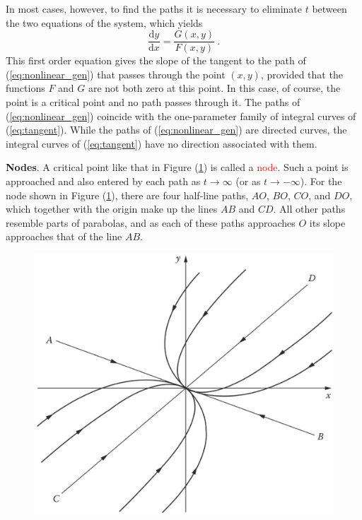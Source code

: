 \documentclass[12pt,a4paper]{article}
\newcommand{\dif}{\mathrm{d}}
\begin{document}
In most cases, however, to find the paths it is necessary to eliminate $t$ between the two equations of the system, which yields
\begin{equation}
\dfrac{\dif y}{\dif x} = \dfrac{G(x,y)}{F(x,y)} ~.
\label{eq:tangent}
\end{equation}
This first order equation gives the slope of the tangent to the path of (\ref{eq:nonlinear_gen}) that passes through the point $(x,y)$, provided that the functions $F$ and $G$ are not both zero at this point. In this case, of course, the point is a critical point and no path passes through it. The paths of (\ref{eq:nonlinear_gen}) coincide with the one-parameter family of integral curves of (\ref{eq:tangent}). While the paths of (\ref{eq:nonlinear_gen}) are directed curves, the integral curves of (\ref{eq:tangent}) have no direction associated with them.

\textbf{Nodes}. A critical point like that in Figure (\ref{fig:node}) is called a \textcolor{red}{node}. Such a point is approached and also entered by each path as $t \rightarrow \infty$ (or as $t \rightarrow -\infty$). For the node shown in Figure (\ref{fig:node}), there are four half-line paths, $AO$, $BO$, $CO$, and $DO$, which together with the origin make up the lines $AB$ and $CD$. All other paths resemble parts of parabolas, and as each of these paths approaches $O$ its slope approaches that of the line $AB$.

\begin{figure}
\centering
\includegraphics[height=9.cm, angle=0]{node.eps}
\caption{
}
\label{fig:node}
\end{figure}
\end{document}
